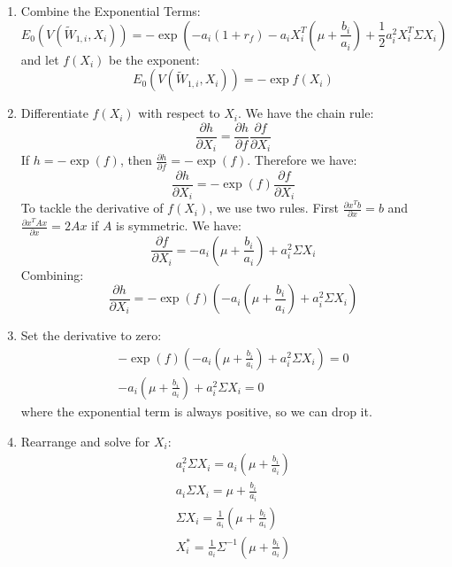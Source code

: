 \begin{enumerate}
    \item Combine the Exponential Terms:
    \begin{equation}
        E_0(V(\tilde{W}_{1,i}, X_i)) = -\exp{(-a_i(1 + r_f)-a_iX_i^T(\mu + \frac{b_i}{a_i})+\frac{1}{2}a_i^2X_i^T\Sigma X_i)}
    \end{equation}
    and let $f(X_i)$ be the exponent:
    \begin{equation}
        E_0(V(\tilde{W}_{1,i}, X_i)) = -\exp{f(X_i)}
    \end{equation}
    \item Differentiate $f(X_i)$ with respect to $X_i$. We have the 
    chain rule:
    \begin{equation}
        \frac{\partial h}{\partial X_i} = \frac{\partial h}{\partial f} \frac{\partial f}{\partial X_i}
    \end{equation}
    If $h = - \exp{(f)}$, then $\frac{\partial h}{\partial f} = - \exp{(f)}$. 
    Therefore we have:
    \begin{equation}
        \frac{\partial h}{\partial X_i} = -\exp{(f)} \frac{\partial f}{\partial X_i}
    \end{equation}
    To tackle the derivative of $f(X_i)$, we use two rules. First $\frac{\partial x^T b}{\partial x} = b$ and
    $\frac{\partial x^T A x}{\partial x} = 2Ax$ if $A$ is symmetric. We have:
    \begin{equation}
        \frac{\partial f}{\partial X_i} = -a_i(\mu + \frac{b_i}{a_i}) + a_i^2 \Sigma X_i
    \end{equation}
    Combining:
    \begin{equation}
        \frac{\partial h}{\partial X_i} = -\exp{(f)} ( -a_i(\mu + \frac{b_i}{a_i}) + a_i^2 \Sigma X_i)
    \end{equation}
    \item Set the derivative to zero:
    \begin{equation}
        \begin{aligned}
            -\exp{(f)} ( -a_i(\mu + \frac{b_i}{a_i}) + a_i^2 \Sigma X_i) = 0 \\
            -a_i(\mu + \frac{b_i}{a_i}) + a_i^2 \Sigma X_i = 0
        \end{aligned}
    \end{equation}
    where the exponential term is always positive, so we can drop it.
    \item Rearrange and solve for $X_i$:
    \begin{equation}
        \begin{aligned}
            a_i^2 \Sigma X_i = a_i(\mu + \frac{b_i}{a_i}) \\
            a_i \Sigma X_i = \mu + \frac{b_i}{a_i} \\
            \Sigma X_i = \frac{1}{a_i}( \mu + \frac{b_i}{a_i}) \\
            X^*_i = \frac{1}{a_i} \Sigma^{-1}(\mu + \frac{b_i}{a_i})
        \end{aligned}
    \end{equation}
\end{enumerate}



